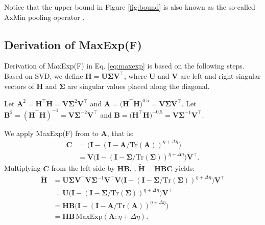 Notice that the upper bound in Figure \ref{fig:bound} is also known as the so-called AxMin pooling operator .



\subsection{Derivation of MaxExp(F)}
\label{sec:maxexp}

Derivation of MaxExp(F) in Eq. \eqref{eq:maxexp} is based on the following steps. Based on SVD, we define $\mathbf{H}=\mathbf{U}\mathbf{\Sigma}\mathbf{V}^\top$, where $\mathbf{U}$ and $\mathbf{V}$ are left and right singular vectors of $\mathbf{H}$ and $\mathbf{\Sigma}$ are singular values placed along the diagonal. 

\vspace{0.1cm}
\noindent Let $\mathbf{A}^2\!=\!\mathbf{H}^\top\mathbf{H}\!=\!\mathbf{V}\mathbf{\Sigma}^2\mathbf{V}^\top$ and $\mathbf{A}\!=\!\big(\mathbf{H}^\top\mathbf{H})^{0.5}\!=\!\mathbf{V}\mathbf{\Sigma}\mathbf{V}^\top$. Let  $\mathbf{B}^2\!=\!(\mathbf{H}^\top\mathbf{H})^{-1}\!=\!\mathbf{V}\mathbf{\Sigma}^{-2}\mathbf{V}^\top$ and $\mathbf{B}\!=\!\big(\mathbf{H}^\top\mathbf{H}\big)^{-0.5}\!=\!\mathbf{V}\mathbf{\Sigma}^{-1}\mathbf{V}^\top$.

\vspace{0.1cm}
\noindent We apply MaxExp(F) from  to $\mathbf{A}$, that is:
%
\begin{equation}
\begin{aligned}
\mathbf{C}&=\big(\mathbf{I}-(\mathbf{I}-\mathbf{A}/\text{Tr}(\mathbf{A}))^{\eta+\Delta\eta}\big)\\
&=\mathbf{V}\big(\mathbf{I}-(\mathbf{I}-\mathbf{\Sigma}/\text{Tr}(\mathbf{\Sigma}))^{\eta+\Delta\eta}\big)\mathbf{V}^\top.
\end{aligned}
\end{equation}
%
Multiplying $\mathbf{C}$ from the left side by $\mathbf{H}\mathbf{B}$, \ie, $\widetilde{\mathbf{H}}=\mathbf{H}\mathbf{B}\mathbf{C}$ yields: 
%
\begin{equation}
\begin{aligned}
\widetilde{\mathbf{H}}&=\mathbf{U}\mathbf{\Sigma}\mathbf{V}^\top\mathbf{V}\mathbf{\Sigma}^{-1}\mathbf{V}^\top \mathbf{V}\big(\mathbf{I}-(\mathbf{I}-\mathbf{\Sigma}/\text{Tr}(\mathbf{\Sigma}))^{\eta+\Delta\eta}\big)\mathbf{V}^\top\\
&=\mathbf{U}\big(\mathbf{I}-(\mathbf{I}-\mathbf{\Sigma}/\text{Tr}(\mathbf{\Sigma}))^{\eta+\Delta\eta}\big)\mathbf{V}^\top\\
&=\mathbf{H}\mathbf{B}\big(\mathbf{I}-(\mathbf{I}-\mathbf{A}/\text{Tr}(\mathbf{A}))^{\eta+\Delta\eta}\big)\\
&=\mathbf{H}\mathbf{B}\,\text{MaxExp}(\mathbf{A}; \eta+\Delta\eta).
\end{aligned}
\end{equation}

